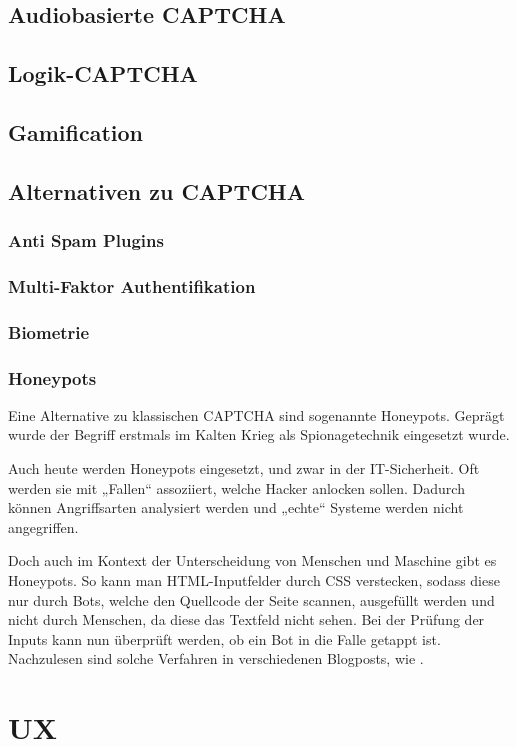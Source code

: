 \subsection{Audiobasierte CAPTCHA}
\subsection{Logik-CAPTCHA}
\subsection{Gamification}
\subsection{Alternativen zu CAPTCHA}
\subsubsection{Anti Spam Plugins}
\subsubsection{Multi-Faktor Authentifikation}
\subsubsection{Biometrie}
\subsubsection{Honeypots}

Eine Alternative zu klassischen CAPTCHA sind sogenannte Honeypots. 
Geprägt wurde der Begriff erstmals im Kalten Krieg als Spionagetechnik eingesetzt wurde. \cite[p.2]{joshi:2011} 

Auch heute werden Honeypots eingesetzt, und zwar in der IT-Sicherheit. 
Oft werden sie mit „Fallen“ assoziiert, welche Hacker anlocken sollen. 
Dadurch können Angriffsarten analysiert werden und „echte“ Systeme werden nicht angegriffen.

Doch auch im Kontext der Unterscheidung von Menschen und Maschine gibt es Honeypots. 
So kann man HTML-Inputfelder durch CSS verstecken, sodass diese nur durch Bots, welche den Quellcode der Seite scannen, ausgefüllt werden 
und nicht durch Menschen, da diese das Textfeld nicht sehen. 
Bei der Prüfung der Inputs kann nun überprüft werden, ob ein Bot in die Falle getappt ist. 
Nachzulesen sind solche Verfahren in verschiedenen Blogposts, wie \cite{perry:2019}.


\section{UX}

